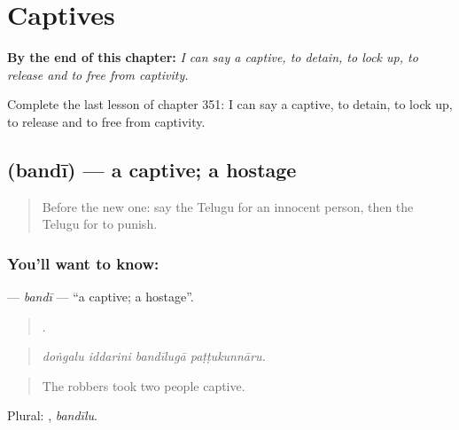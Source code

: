 
\chapter{Captives}
\label{ch:te-captives}

\begin{chapteropening}
\textbf{By the end of this chapter:} \emph{I can say a captive, to detain, to lock up, to release and to free from captivity.}

Complete the last lesson of chapter 351: I can say a captive, to detain, to lock up, to release and to free from captivity.
\end{chapteropening}

\section[\texorpdfstring{\te{బందీ} (bandī)}{బందీ (bandī)}]{ (bandī) — a captive; a hostage}

\label{lesson:TE-C351-bandi}



\begin{quote}
Before the new one: say the Telugu for an innocent person, then the Telugu for to punish.
\end{quote}

\subsection*{You'll want to know: }
\textbf{} — \emph{bandī} — \textquotedblleft{}a captive; a hostage\textquotedblright{}.

\begin{quote}
   .
\end{quote}

\begin{quote}
\emph{doṅgalu iddarini bandīlugā paṭṭukunnāru.}
\end{quote}

\begin{quote}
The robbers took two people captive.
\end{quote}

Plural: , \emph{bandīlu}.


